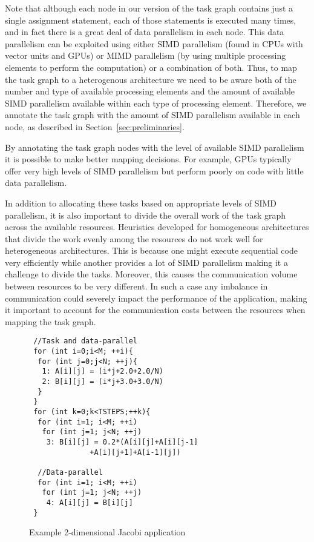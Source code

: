 Note that although each node in our version of the task graph contains
just a single assignment statement, each of those statements is executed
many times, and in fact there is a great deal of data parallelism in
each node. This data parallelism can be exploited using either SIMD
parallelism (found in CPUs with vector units and GPUs) or MIMD
parallelism (by using multiple processing elements to perform the
computation) or a combination of both. Thus, to map the task graph to a
heterogenous architecture we need to be aware both of the number and
type of available processing elements and the amount of available SIMD
parallelism available within each type of processing element. Therefore,
we annotate the task graph with the amount of SIMD parallelism available
in each node, as described in Section~\ref{sec:preliminaries}.

By annotating the task graph nodes with the level of available SIMD
parallelism it is possible to make better mapping decisions.  For
example, GPUs typically offer very high levels of SIMD parallelism but
perform poorly on code with little data parallelism.

In addition to allocating these tasks based on appropriate levels of SIMD
parallelism, it is also important to divide the overall work of the
task graph across the available resources. Heuristics developed for
homogeneous architectures that divide the work evenly among the
resources do not work well for heterogeneous architectures. This is
because one might execute sequential code very efficiently while
another provides a lot of SIMD parallelism making it a challenge to
divide the tasks. Moreover, this causes the communication volume
between resources to be very different. In such a case any
imbalance in communication could severely impact the performance of
the application, making it important to account for the communication
costs between the resources when mapping the task graph.

\begin{scriptsize}
  \begin{figure}[h!]
    \centering
\begin{verbatim}
 //Task and data-parallel
 for (int i=0;i<M; ++i){
  for (int j=0;j<N; ++j){
   1: A[i][j] = (i*j+2.0+2.0/N)
   2: B[i][j] = (i*j+3.0+3.0/N)
  }
 }
 for (int k=0;k<TSTEPS;++k){
  for (int i=1; i<M; ++i)
   for (int j=1; j<N; ++j)
    3: B[i][j] = 0.2*(A[i][j]+A[i][j-1]
              +A[i][j+1]+A[i-1][j])

  //Data-parallel
  for (int i=1; i<M; ++i)
   for (int j=1; j<N; ++j)
    4: A[i][j] = B[i][j]
 }
\end{verbatim}
    \caption{Example 2-dimensional Jacobi application}
    \label{fig:2}
  \end{figure}
\end{scriptsize}

